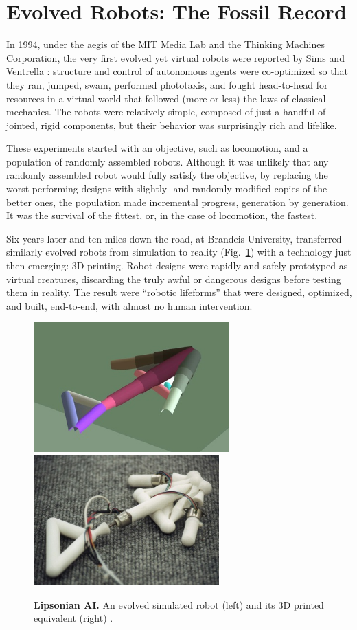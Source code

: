\section{Evolved Robots: The Fossil Record}


In 1994,
under the aegis of the MIT Media Lab and the Thinking Machines Corporation,
the very first evolved yet virtual robots were reported by Sims \cite{sims1994evolving,sims1994comp} and Ventrella \cite{ventrella1994explorations}: structure and control of autonomous agents were co-optimized so that they ran, jumped, swam, performed phototaxis, and fought head-to-head for resources in a virtual world that followed (more or less) the laws of classical mechanics. 
The robots were relatively simple, composed of just a handful of jointed, rigid components, but their behavior was surprisingly rich and lifelike.

These experiments started with an objective, such as locomotion, and a population of randomly assembled robots. 
Although it was unlikely that any randomly assembled robot would fully satisfy the objective, by replacing the worst-performing designs with slightly- and randomly modified copies of the better ones, the population made incremental progress, generation by generation. 
It was the survival of the fittest, or, in the case of locomotion, the fastest.

Six years later and ten miles down the road, at Brandeis University, \citet{lipson2000automatic} transferred similarly evolved robots from simulation to reality (Fig.~\ref{fig:lipson}) with a technology just then emerging: 3D printing. Robot designs were rapidly and safely prototyped as virtual creatures, discarding the truly awful or dangerous designs before testing them in reality. 
The result were ``robotic lifeforms'' that were designed, optimized, and built, end-to-end, with almost no human intervention. 


\begin{figure}
\centering
\includegraphics[height=5cm]{fig/arrow-hires1.jpg}
\includegraphics[height=5cm]{fig/arrow-hires2.jpg}
\caption{\label{fig:lipson}%
\textbf{Lipsonian AI.}
An evolved simulated robot (left) and its 3D printed equivalent (right) \cite{lipson2000automatic}.
}
\end{figure}

